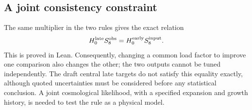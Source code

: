 \subsection{A joint consistency constraint}
The same multiplier in the two rules gives the exact relation
\begin{equation}
H_0^{\rm late}S_8^{\rm obs}
=H_0^{\rm early}S_8^{\rm input}.
\end{equation}
This is proved in Lean. Consequently, changing a common load factor to improve one comparison also changes the other; the two outputs cannot be tuned independently. The draft central late targets do not satisfy this equality exactly, although quoted uncertainties must be considered before any statistical conclusion. A joint cosmological likelihood, with a specified expansion and growth history, is needed to test the rule as a physical model.
